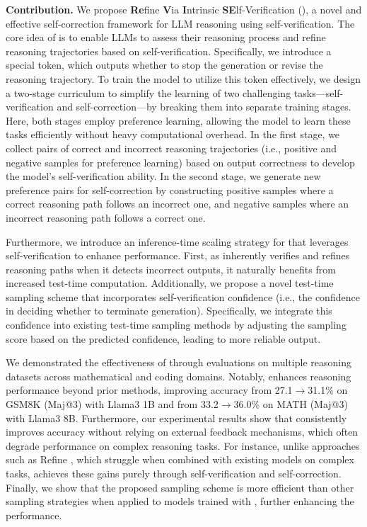 \textbf{Contribution.} We propose \textbf{Re}fine \textbf{V}ia \textbf{I}ntrinsic \textbf{SE}lf-Verification (\sname), a novel and effective self-correction framework for LLM reasoning using self-verification. The core idea of \sname is to enable LLMs to assess their reasoning process and refine reasoning trajectories based on self-verification. Specifically, we introduce a special token, which outputs whether to stop the generation or revise the reasoning trajectory. To train the model to utilize this token effectively, we design a two-stage curriculum to simplify the learning of two challenging tasks—self-verification and self-correction—by breaking them into separate training stages. Here, both stages employ preference learning, allowing the model to learn these tasks efficiently without heavy computational overhead. In the first stage, we collect pairs of correct and incorrect reasoning trajectories (i.e., positive and negative samples for preference learning) based on output correctness to develop the model’s self-verification ability. In the second stage, we generate new preference pairs for self-correction by constructing positive samples where a correct reasoning path follows an incorrect one, and negative samples where an incorrect reasoning path follows a correct one.

Furthermore, we introduce an inference-time scaling strategy for \sname that leverages self-verification to enhance performance. First, as \sname inherently verifies and refines reasoning paths when it detects incorrect outputs, it naturally benefits from increased test-time computation. Additionally, we propose a novel test-time sampling scheme that incorporates self-verification confidence (i.e., the confidence in deciding whether to terminate generation). Specifically, we integrate this confidence into existing test-time sampling methods by adjusting the sampling score based on the predicted confidence, leading to more reliable output.

We demonstrated the effectiveness of \sname through evaluations on multiple reasoning datasets across mathematical and coding domains. Notably, \sname enhances reasoning performance beyond prior methods, improving accuracy from 27.1$\to$31.1\% on GSM8K (Maj@3) \citep{cobbe2021gsm8k} with Llama3 1B \citep{dubey2024llama} and from 33.2$\to$36.0\% on MATH (Maj@3) \citep{hendrycks2021math} with Llama3 8B. Furthermore, our experimental results show that \sname consistently improves accuracy without relying on external feedback mechanisms, which often degrade performance on complex reasoning tasks. For instance, unlike approaches such as Refine \citep{madaan2023selfrefine}, which struggle when combined with existing models on complex tasks, \sname achieves these gains purely through self-verification and self-correction. Finally, we show that the proposed sampling scheme is more efficient than other sampling strategies when applied to models trained with \sname, further enhancing the performance.
